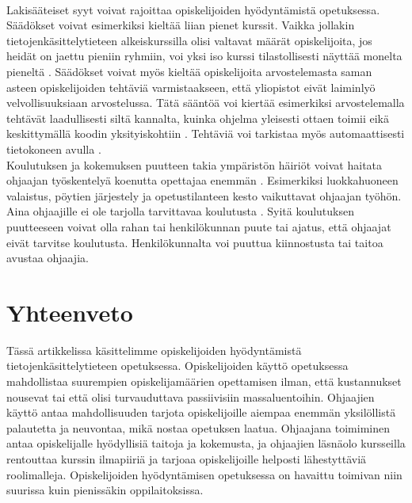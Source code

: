 \documentclass[finnish]{tktltiki2}
\theoremstyle{definition}
\theoremstyle{remark}
\begin{document}
\\
Lakisääteiset syyt voivat rajoittaa opiskelijoiden hyödyntämistä opetuksessa. Säädökset voivat esimerkiksi kieltää liian pienet kurssit. Vaikka jollakin tietojenkäsittelytieteen alkeiskurssilla olisi valtavat määrät opiskelijoita, jos heidät on jaettu pieniin ryhmiin, voi yksi iso kurssi tilastollisesti näyttää monelta pieneltä \cite{Reges03}. Säädökset voivat myös kieltää opiskelijoita arvostelemasta saman asteen opiskelijoiden tehtäviä varmistaakseen, että yliopistot eivät laiminlyö velvollisuuksiaan arvostelussa. Tätä sääntöä voi kiertää esimerkiksi arvostelemalla tehtävät laadullisesti siltä kannalta, kuinka ohjelma yleisesti ottaen toimii eikä keskittymällä koodin yksityiskohtiin \cite{Dickson11}. Tehtäviä voi tarkistaa myös automaattisesti tietokoneen avulla \cite{Vihavainen}.
\\
Koulutuksen ja kokemuksen puutteen takia ympäristön häiriöt voivat haitata ohjaajan työskentelyä koenutta opettajaa enemmän \cite{Patitsas12_3}. Esimerkiksi luokkahuoneen valaistus, pöytien järjestely ja opetustilanteen kesto vaikuttavat ohjaajan työhön.
\\
Aina ohjaajille ei ole tarjolla tarvittavaa koulutusta \cite{Shannon98}. Syitä koulutuksen puutteeseen voivat olla rahan tai henkilökunnan puute tai ajatus, että ohjaajat eivät tarvitse koulutusta. Henkilökunnalta voi puuttua kiinnostusta tai taitoa avustaa ohjaajia.



\section{Yhteenveto}
Tässä artikkelissa käsittelimme opiskelijoiden hyödyntämistä tietojenkäsittelytieteen opetuksessa. Opiskelijoiden käyttö opetuksessa mahdollistaa suurempien opiskelijamäärien opettamisen ilman, että kustannukset nousevat tai että olisi turvauduttava passiivisiin massaluentoihin. Ohjaajien käyttö antaa mahdollisuuden tarjota opiskelijoille aiempaa enemmän yksilöllistä palautetta ja neuvontaa, mikä nostaa opetuksen laatua. Ohjaajana toimiminen antaa opiskelijalle hyödyllisiä taitoja ja kokemusta, ja ohjaajien läsnäolo kursseilla rentouttaa kurssin ilmapiiriä ja tarjoaa opiskelijoille helposti lähestyttäviä roolimalleja. Opiskelijoiden hyödyntämisen opetuksessa on havaittu toimivan niin suurissa kuin pienissäkin oppilaitoksissa.




\end{document}
